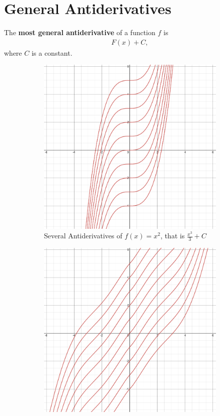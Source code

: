 \documentclass[12pt,a4paper]{article}
\begin{document}
\newpage

\section{General Antiderivatives}
The \textbf{most general antiderivative} of a function $f$ is 
	\begin{align*}
	F(x) + C ,
	\end{align*}	 
where $C$ is a constant.

	\begin{figure}[h]
		\centering
		\begin{subfigure}[b]{0.49\textwidth}
		\includegraphics[scale=0.265]{section3-9_antiderivates1.png}
		\caption{Several Antiderivatives of $f(x)=x^2$, that is $\frac{x^3}{3} + C$}
		\end{subfigure}
		\hfill
		\begin{subfigure}[b]{0.49\textwidth}
		\includegraphics[scale=0.265]{section3-9_antiderivates.png}

\end{subfigure}
\end{figure}
\end{document}
